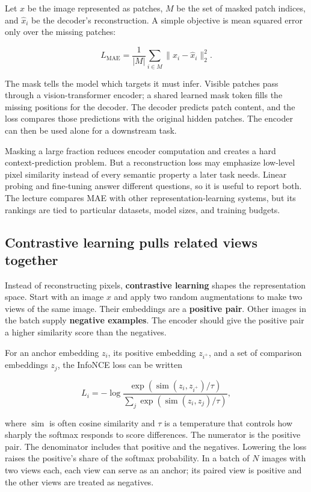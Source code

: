 Let \(x\) be the image represented as patches, \(M\) be the set of masked patch indices, and \(\hat{x}_i\) be the decoder's reconstruction. A simple objective is mean squared error only over the missing patches:

\[
L_{\text{MAE}}=\frac{1}{|M|}\sum_{i\in M}\|x_i-\hat{x}_i\|_2^2.
\]

The mask tells the model which targets it must infer. Visible patches pass through a vision-transformer encoder; a shared learned mask token fills the missing positions for the decoder. The decoder predicts patch content, and the loss compares those predictions with the original hidden patches. The encoder can then be used alone for a downstream task.

Masking a large fraction reduces encoder computation and creates a hard context-prediction problem. But a reconstruction loss may emphasize low-level pixel similarity instead of every semantic property a later task needs. Linear probing and fine-tuning answer different questions, so it is useful to report both. The lecture compares MAE with other representation-learning systems, but its rankings are tied to particular datasets, model sizes, and training budgets.

\subsection{Contrastive learning pulls related views together}\label{04-visual-computing-ii-ch031-contrastive-learning-pulls-related-views-together}

Instead of reconstructing pixels, \textbf{contrastive learning} shapes the representation space. Start with an image \(x\) and apply two random augmentations to make two views of the same image. Their embeddings are a \textbf{positive pair}. Other images in the batch supply \textbf{negative examples}. The encoder should give the positive pair a higher similarity score than the negatives.

For an anchor embedding \(z_i\), its positive embedding \(z_{i^+}\), and a set of comparison embeddings \(z_j\), the InfoNCE loss can be written

\[
L_i=-\log\frac{\exp(\operatorname{sim}(z_i,z_{i^+})/\tau)}
{\sum_j\exp(\operatorname{sim}(z_i,z_j)/\tau)},
\]

where \(\operatorname{sim}\) is often cosine similarity and \(\tau\) is a temperature that controls how sharply the softmax responds to score differences. The numerator is the positive pair. The denominator includes that positive and the negatives. Lowering the loss raises the positive's share of the softmax probability. In a batch of \(N\) images with two views each, each view can serve as an anchor; its paired view is positive and the other views are treated as negatives.

